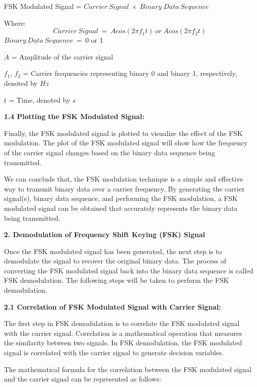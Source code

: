 \documentclass{article} %
\begin{document}
\noindent 

\noindent FSK Modulated Signal = $Carrier\ Signal\ \times \ Binary\ Data\ Sequence$

\noindent Where:
\[\ Carrier\ Signal\ =\ Acos(2\pi f_1t)\ or\ Acos(2\pi f_2t)\] 
$Binary\ Data\ Sequence\ =\ $0 or 1

\noindent $A$ = Amplitude of the carrier signal

\noindent $f_1$, $f_2$ = Carrier frequencies representing binary 0 and binary 1, respectively, denoted by $Hz$

\noindent $t$ = Time, denoted by $s$

\noindent 

\noindent \textbf{1.4 Plotting the FSK Modulated Signal:}

\noindent Finally, the FSK modulated signal is plotted to visualize the effect of the FSK modulation. The plot of the FSK modulated signal will show how the frequency of the carrier signal changes based on the binary data sequence being transmitted.

\noindent We can conclude that, the FSK modulation technique is a simple and effective way to transmit binary data over a carrier frequency. By generating the carrier signal(s), binary data sequence, and performing the FSK modulation, a FSK modulated signal can be obtained that accurately represents the binary data being transmitted.

\noindent \textbf{}

\noindent \textbf{2. Demodulation of Frequency Shift Keying (FSK) Signal}

\noindent Once the FSK modulated signal has been generated, the next step is to demodulate the signal to recover the original binary data. The process of converting the FSK modulated signal back into the binary data sequence is called FSK demodulation. The following steps will be taken to perform the FSK demodulation.

\noindent 

\noindent \textbf{2.1 Correlation of FSK Modulated Signal with Carrier Signal:}

\noindent The first step in FSK demodulation is to correlate the FSK modulated signal with the carrier signal. Correlation is a mathematical operation that measures the similarity between two signals. In FSK demodulation, the FSK modulated signal is correlated with the carrier signal to generate decision variables.

\noindent The mathematical formula for the correlation between the FSK modulated signal and the carrier signal can be represented as follows:
\end{document}
